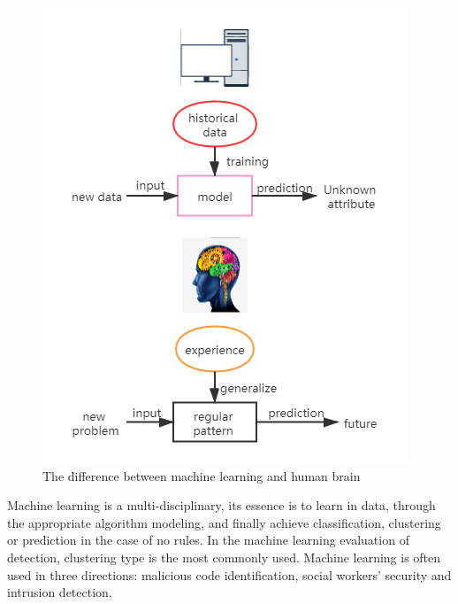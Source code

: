 \documentclass[UTF8]{article}
\begin{document}
\begin{figure}[h]
\centering
\includegraphics[scale = 0.5]{0}
\caption{The difference between machine learning and human brain}
\end{figure}
	
	Machine learning is a multi-disciplinary, its essence is to learn in data, through the appropriate algorithm modeling, and finally achieve classification, clustering or prediction in the case of no rules. In the machine learning evaluation of detection, clustering type is the most commonly used. \cite{5} Machine learning is often used in three directions: malicious code identification, social workers' security and intrusion detection.
	
\end{document}
